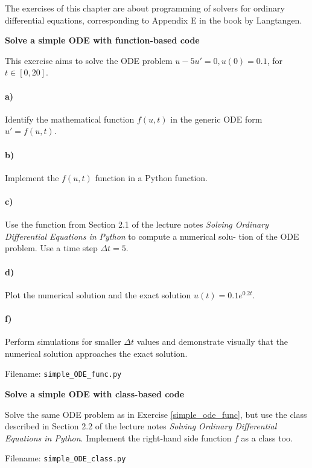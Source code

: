 The exercises of this chapter are about programming of solvers for ordinary differential
equations, corresponding to Appendix E in the book by Langtangen.


\begin{Problem}{\textbf{Solve a simple ODE with function-based code}}\label{simple_ode_func}

\noindent
This exercise aims to solve the ODE problem $u - 5u' = 0, u(0) = 0.1$, for $t \in [0,20]$.
\paragraph{a)} Identify the mathematical function $f(u,t)$ in the generic ODE form $u' = f(u,t)$.
\paragraph{b)} Implement the $f(u,t)$ function in a Python function.
\paragraph{c)} Use the  function from Section 2.1 of the
lecture notes \emph{Solving Ordinary Differential Equations in Python} to compute a numerical solu-
tion of the ODE problem. Use a time step $\Delta t = 5$.
\paragraph{d)} Plot the numerical solution and the exact solution $u(t) = 0.1e^{0.2t}$.
\paragraph{f)} Perform simulations for smaller $\Delta t$ values and demonstrate visually that the
numerical solution approaches the exact solution.

Filename: \texttt{simple\_ODE\_func.py}
\end{Problem}

\begin{Problem}{\textbf{Solve a simple ODE with class-based code}}\label{simple_ode_class}

\noindent
Solve the same ODE problem as in Exercise \ref{simple_ode_func}, but use the
 class described in Section 2.2 of the lecture
notes \emph{Solving Ordinary Differential Equations in Python}.
Implement the right-hand side function $f$ as a class too.

Filename: \texttt{simple\_ODE\_class.py}
\end{Problem}

